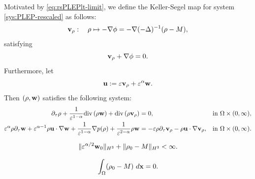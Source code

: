 \documentclass[10pt,a4paper]{amsart}
\newcommand{\dtau}{\partial_\tau}
\newcommand{\dv}{\mathrm{div}\, }
\newcommand{\idx}{\ d\vec x}
\newcommand{\norm}[2]{\Vert #1 \Vert_{#2}}
\renewcommand{\vec}[1]{{\bf #1}}
\begin{document}
Motivated by \eqref{eq:rsPLEPlt-limit}, we define the Keller-Segel map for system \eqref{sys:PLEP-rescaled} as follows:
\begin{equation}
    \label{def:KS-map}
    \vec v_\rho: \quad \rho \mapsto  - \nabla \phi = - \nabla (-\Delta)^{-1} (\rho -M),
\end{equation}
satisfying 
\begin{equation}
    \label{def:KS-map-2}
     \vec v_\rho + \nabla \phi = 0.
\end{equation}
Furthermore, let 
\begin{equation}
    \label{def:perturbation-u}
    \vec u := \varepsilon \vec v_\rho + \varepsilon^{\alpha} \vec w.
\end{equation}
Then $ (\rho, \vec w) $ satisfies the following system:
\begin{subequations}
    \label{sys:PLEP-perturbation}
    \begin{align}
        \label{eq:ptb-01}
        \dtau \rho + \frac{1}{\varepsilon^{1-\alpha}} \dv(\rho \vec w) + \dv (\rho \vec v_\rho) & = 0, & \text{in} \ \Omega \times (0,\infty), \\
        \label{eq:ptb-02}
        \varepsilon^\alpha \rho \dtau \vec w + \varepsilon^{\alpha -1} \rho \vec u \cdot \nabla \vec w + \frac{1}{\varepsilon^{1-\alpha}}\nabla p(\rho) + \frac{1}{\varepsilon^{2-\alpha}} \rho \vec w & = -  \varepsilon \rho \dtau \vec v_\rho - \rho \vec u \cdot \nabla \vec v_\rho, & \text{in} \ \Omega \times (0,\infty).
    \end{align}
\end{subequations}

\begin{equation}
    \label{initial:000}
    \norm{\varepsilon^{\alpha/2} \vec w_0}{H^3} + \norm{\rho_0-M}{H^3} < \infty. 
\end{equation}

\begin{equation}
    \label{initial:002}
    \int_{\Omega} (\rho_0 - M) \idx = 0.
\end{equation}
\end{document}
